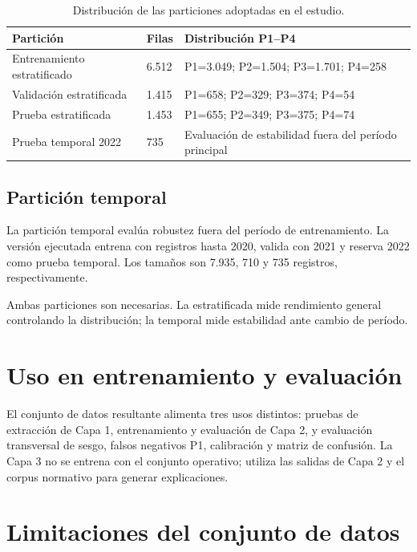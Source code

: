 \begin{table}[htbp]
\centering
\small
\begin{tabular}{|p{3.2cm}|p{3.0cm}|p{5.4cm}|}
\hline
\textbf{Partición} & \textbf{Filas} & \textbf{Distribución P1--P4} \\ \hline
Entrenamiento estratificado & 6.512 & P1=3.049; P2=1.504; P3=1.701; P4=258 \\ \hline
Validación estratificada & 1.415 & P1=658; P2=329; P3=374; P4=54 \\ \hline
Prueba estratificada & 1.453 & P1=655; P2=349; P3=375; P4=74 \\ \hline
Prueba temporal 2022 & 735 & Evaluación de estabilidad fuera del período principal \\ \hline
\end{tabular}
\caption{Distribución de las particiones adoptadas en el estudio.}
\label{tab:splits-final-cap7}
\end{table}

\subsection{Partición temporal}

La partición temporal evalúa robustez fuera del período de entrenamiento. La versión ejecutada entrena con registros hasta 2020, valida con 2021 y reserva 2022 como prueba temporal. Los tamaños son 7.935, 710 y 735 registros, respectivamente.

Ambas particiones son necesarias. La estratificada mide rendimiento general controlando la distribución; la temporal mide estabilidad ante cambio de período.

\section{Uso en entrenamiento y evaluación}

El conjunto de datos resultante alimenta tres usos distintos: pruebas de extracción de Capa 1, entrenamiento y evaluación de Capa 2, y evaluación transversal de sesgo, falsos negativos P1, calibración y matriz de confusión. La Capa 3 no se entrena con el conjunto operativo; utiliza las salidas de Capa 2 y el corpus normativo para generar explicaciones.

\section{Limitaciones del conjunto de datos}

